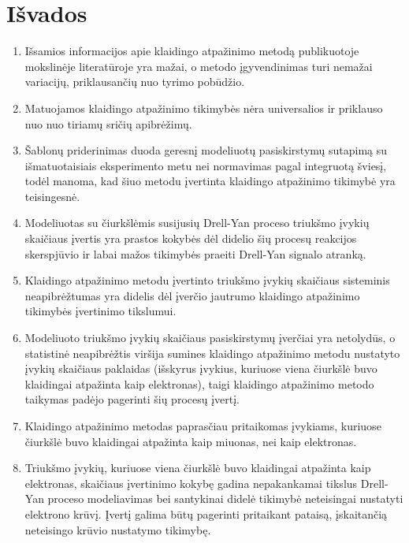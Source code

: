 \documentclass[a4paper, 12pt, oneside]{article}
\begin{document}
\section*{Išvados} 
\begin{enumerate}
	\item Išsamios informacijos apie klaidingo atpažinimo metodą publikuotoje mokslinėje literatūroje yra mažai, o metodo
	įgyvendinimas turi nemažai variacijų, priklausančių nuo tyrimo pobūdžio.
	\item Matuojamos klaidingo atpažinimo tikimybės nėra universalios ir priklauso nuo nuo tiriamų sričių apibrėžimų.
	\item Šablonų priderinimas duoda geresnį modeliuotų pasiskirstymų sutapimą su išmatuotaisiais eksperimento metu 
	nei normavimas pagal integruotą šviesį, todėl manoma, kad šiuo metodu įvertinta klaidingo atpažinimo tikimybė yra teisingesnė.
	\item Modeliuotas su čiurkšlėmis susijusių Drell-Yan proceso triukšmo įvykių skaičiaus įvertis yra prastos kokybės
	dėl didelio šių procesų reakcijos skerspjūvio ir labai mažos tikimybės praeiti Drell-Yan signalo atranką.
	\item Klaidingo atpažinimo metodu įvertinto triukšmo įvykių skaičiaus sisteminis neapibrėžtumas yra didelis dėl įverčio
	jautrumo klaidingo atpažinimo tikimybės įvertinimo tikslumui.
	\item Modeliuoto triukšmo įvykių skaičiaus pasiskirstymų įverčiai yra netolydūs, o statistinė neapibrėžtis viršija
	sumines klaidingo atpažinimo metodu nustatyto įvykių skaičiaus paklaidas (išskyrus įvykius, kuriuose viena čiurkšlė
	buvo klaidingai atpažinta kaip elektronas), taigi klaidingo atpažinimo metodo taikymas padėjo pagerinti šių procesų įvertį. 
	\item Klaidingo atpažinimo metodas paprasčiau pritaikomas įvykiams, kuriuose čiurkšlė buvo klaidingai atpažinta kaip
	miuonas, nei kaip elektronas.
	\item Triukšmo įvykių, kuriuose viena čiurkšlė buvo klaidingai atpažinta kaip elektronas, skaičiaus įvertinimo kokybę
	gadina nepakankamai tikslus Drell-Yan proceso modeliavimas bei santykinai didelė tikimybė neteisingai nustatyti elektrono krūvį.
	Įvertį galima būtų pagerinti pritaikant pataisą, įskaitančią neteisingo krūvio nustatymo tikimybę.

\end{enumerate}


\newpage
{}


\end{document}
